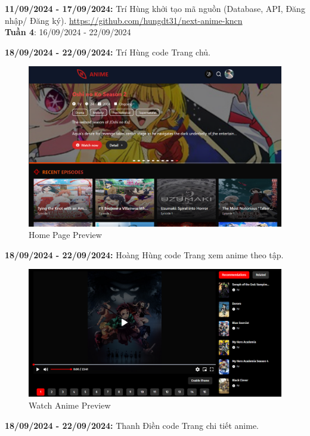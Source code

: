 \textbf{11/09/2024 - 17/09/2024:} Trí Hùng khởi tạo mã nguồn (Database, API, Đăng nhập/ Đăng ký). \href{https://github.com/hungdt31/next-anime-kncn}{https://github.com/hungdt31/next-anime-kncn}
\vspace{1cm}
\\
\textbf{Tuần 4}: 16/09/2024 - 22/09/2024

\textbf{18/09/2024 - 22/09/2024:} Trí Hùng code Trang chủ. \\
\begin{figure}[H]
    \centering
    \includegraphics[width=0.8\linewidth]{content/planning/image/home.png}
    \caption{Home Page Preview}
    \label{fig:enter-label}
\end{figure}
\textbf{18/09/2024 - 22/09/2024:} Hoàng Hùng code Trang xem anime theo tập.\\
\begin{figure}[H]
    \centering
    \includegraphics[width=0.8\linewidth]{content/planning/image/watch.png}
    \caption{Watch Anime Preview}
    \label{fig:enter-label}
\end{figure}
\textbf{18/09/2024 - 22/09/2024:} Thanh Điền code Trang chi tiết anime. \\
